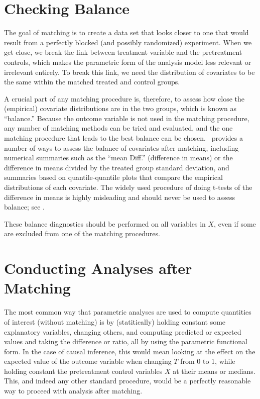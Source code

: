 \section{Checking Balance}
\label{sec:balance-sum}

The goal of matching is to create a data set that looks closer to one
that would result from a perfectly blocked (and possibly randomized)
experiment.  When we get close, we break the link between treatment
variable and the pretreatment controls, which makes the parametric
form of the analysis model less relevant or irrelevant entirely.  To
break this link, we need the distribution of covariates to be the same
within the matched treated and control groups.

A crucial part of any matching procedure is, therefore, to assess how
close the (empirical) covariate distributions are in the two groups,
which is known as ``balance.''  Because the outcome variable is not
used in the matching procedure, any number of matching methods can be
tried and evaluated, and the one matching procedure that leads to the
best balance can be chosen.  \MatchIt\ provides a number of ways to
assess the balance of covariates after matching, including numerical
summaries such as the ``mean Diff.'' (difference in means) or the
difference in means divided by the treated group standard deviation,
and summaries based on quantile-quantile plots that compare the
empirical distributions of each covariate.  The widely used procedure
of doing t-tests of the difference in means is highly misleading and
should never be used to assess balance; see \citet{ImaKinStu07}.

These balance diagnostics should be performed on all variables in $X$,
even if some are excluded from one of the matching procedures.

\section{Conducting Analyses after Matching}

The most common way that parametric analyses are used to compute
quantities of interest (without matching) is by (statitically) holding
constant some explanatory variables, changing others, and computing
predicted or expected values and taking the difference or ratio, all
by using the parametric functional form.  In the case of causal
inference, this would mean looking at the effect on the expected value
of the outcome variable when changing $T$ from 0 to 1, while holding
constant the pretreatment control variables $X$ at their means or
medians.  This, and indeed any other standard procedure, would be a
perfectly reasonable way to proceed with analysis after matching.


